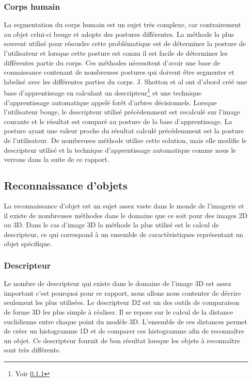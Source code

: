 \subsubsection{Corps humain}
La segmentation du corps humain est un sujet très complexe, car contrairement au objet celui-ci bouge et adopte
des postures différentes. La méthode la plus souvent utilisé pour résoudre cette problématique est de déterminer
la posture de l'utilisateur et lorsque cette posture est connu il est facile de déterminer les différentes partie
du corps. Ces méthodes nécessitent d'avoir une base de connaissance contenant de nombreuses postures qui doivent
être segmenter et labelisé avec les différentes parties du corps. J. Shotton et al\cite{kinectSegmentation} ont
d'abord créé une base d'apprentissage en calculant un descripteur\footnote{Voir \ref{descriptor}}
et une technique d'apprentissage automatique appelé forêt d'arbres décisionnels\cite{randomDecisionForest}. 
Lorsque l'utilisateur bouge, le descripteur utilisé précédemment est recalculé sur l'image courante et le résultat 
est comparé au posture de la base d'apprentissage. La posture ayant une valeur proche du résultat calculé précédemment 
est la posture de l'utilisateur. De nombreuses méthode utilise cette solution, mais elle modifie le descripteur
utilisé et la technique d'apprentissage automatique comme nous le verrons dans la suite de ce rapport.


\subsection{Reconnaissance d'objets}
La reconnaissance d'objet est un sujet assez vaste dans le monde de l'imagerie et il existe de nombreuses
méthodes dans le domaine que ce soit pour des images 2D ou 3D. Dans le cas d'image 3D la méthode la plus utilisé
est le calcul de descripteur, ce qui correspond à un ensemble de caractèristiques représentant un objet spécifique.

\subsubsection{Descripteur}
\label{descriptor}
Le nombre de descripteur qui existe dans le domaine de l'image 3D est assez important c'est pourquoi pour ce rapport,
nous allons nous contenter de décrire seulement les plus utilisées. Le descripteur D2\cite{D2} est un des outils de 
comparaison de forme 3D les plus simple à réaliser. Il se repose sur le calcul de la distance euclidienne entre 
chaque point du modèle 3D. L'ensemble de ces distances permet de créer un histogramme 1D et de comparer ces histogramme
afin de reconnaître un objet. Ce descripteur fournit de bon résultat lorsque les objets à reconnaître sont très 
différents.\\

